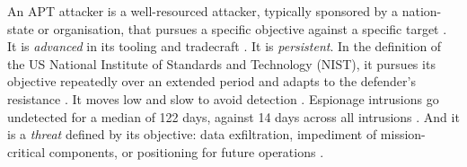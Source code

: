 \documentclass{cshonours}
\begin{document}
An APT attacker is a well-resourced attacker, typically sponsored by a
nation-state or organisation, that pursues a specific objective against a
specific target \citep{alshamrani2019}. It is \emph{advanced} in its tooling and tradecraft
\citep{alshamrani2019}. It is \emph{persistent}. In the definition of the
US National Institute of Standards and Technology (NIST), it pursues its
objective repeatedly over an extended period and adapts to the defender's
resistance \citep{nist2011sp80039}. It moves low and slow to avoid detection \citep{alshamrani2019}. Espionage intrusions go undetected for
a median of 122 days, against 14 days across all intrusions
\citep{mtrends2026}. And it is a \emph{threat} defined by its objective:
data exfiltration, impediment of mission-critical components, or
positioning for future operations \citep{alshamrani2019, nist2011sp80039}.
\end{document}
